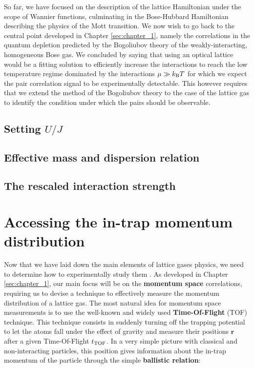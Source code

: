 So far, we have focused on the description of the lattice Hamiltonian under the scope of Wannier functions, culminating in the Bose-Hubbard Hamiltonian describing the physics of the Mott transition. We now wish to go back to the central point developed in Chapter \ref{sec:chapter_1}, namely the \kmk correlations in the quantum depletion predicted by the Bogoliubov theory of the weakly-interacting, homogeneous Bose gas. We concluded by saying that using an optical lattice would be a fitting solution to efficiently increase the interactions to reach the low temperature regime dominated by the interactions $\mu \gg k_{\mathrm{B}} T$ for which we expect the pair correlation signal to be experimentally detectable. This however requires that we extend the method of the Bogoliubov theory to the case of the lattice gas to identify the condition under which the \kmk pairs should be observable.

\subsection{Setting $U/J$}

\subsection{Effective mass and dispersion relation}

\subsection{The rescaled interaction strength}

\section{Accessing the in-trap momentum distribution}

Now that we have laid down the main elements of lattice gases physics, we need to determine how to experimentally study them . As developed in Chapter \ref{sec:chapter_1}, our main focus will be on the \textbf{momentum space} correlations, requiring us to devise a technique to effectively measure the momentum distribution of a lattice gas. The most natural idea for momentum space measurements is to use the well-known and widely used \textbf{Time-Of-Flight} (TOF) technique. This technique consists in suddenly turning off the trapping potential to let the atoms fall under the effect of gravity and measure their positions $\bm{r}$ after a given Time-Of-Flight $t_{\rm{TOF}}$. In a very simple picture with classical and non-interacting particles, this position gives information about the in-trap momentum of the particle through the simple \textbf{ballistic relation}:

